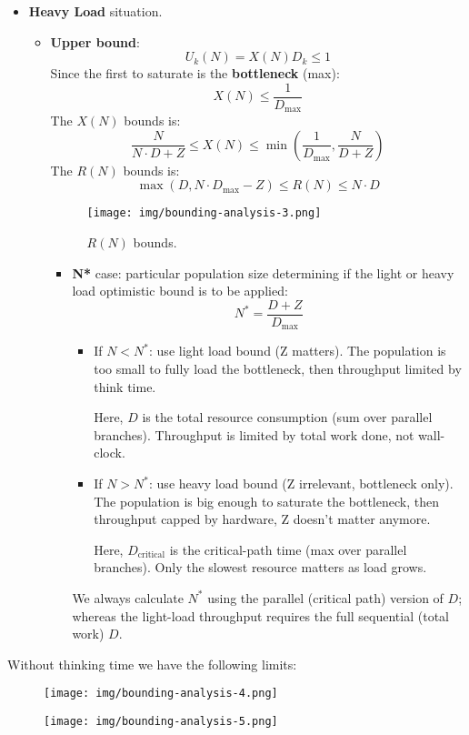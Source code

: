 \begin{itemize}
	\item \textbf{Heavy Load} situation.
	\begin{itemize}
		\item \textbf{Upper bound}:
		\begin{equation}
			U_{k}\left(N\right) = X\left(N\right) D_{k} \le 1
		\end{equation}
		Since the first to saturate is the \textbf{bottleneck} (max):
		\begin{equation}
			X\left(N\right) \le \dfrac{1}{D_{\max}}
		\end{equation}
		The $X\left(N\right)$ bounds is:
		\begin{equation}\label{eq: throughput limits - heavy load}
			\dfrac{N}{N \cdot D + Z} \le X\left(N\right) \le \min\left(\dfrac{1}{D_{\max}}, \dfrac{N}{D+Z}\right)
		\end{equation}
		The $R\left(N\right)$ bounds is:
		\begin{equation}\label{eq: response time - heavy load}
			\max\left(D, N \cdot D_{\max} - Z\right) \le R\left(N\right) \le N \cdot D
		\end{equation}
		\begin{figure}[!htp]
			\centering
			\texttt{[image: img/bounding-analysis-3.png]}
			\caption*{$R\left(N\right)$ bounds.}
		\end{figure}
		\begin{itemize}
			\item \textbf{N*} case: particular population size determining if the light or heavy load optimistic bound is to be applied:
			\begin{equation}\label{eq: N start - limit population size}
				N^{*} = \dfrac{D+Z}{D_{\max}}
			\end{equation}
			\begin{itemize}
				\item If $N < N^{*}$: use light load bound (Z matters). The population is too small to fully load the bottleneck, then throughput limited by think time.

				Here, $D$ is the total resource consumption (sum over parallel branches). Throughput is limited by total work done, not wall-clock.


				\item If $N > N^{*}$: use heavy load bound (Z irrelevant, bottleneck only). The population is big enough to saturate the bottleneck, then throughput capped by hardware, Z doesn't matter anymore.

				Here, $D_{\text{critical}}$ is the critical-path time (max over parallel branches). Only the slowest resource matters as load grows.
			\end{itemize}
			We always calculate $N^*$ using the parallel (critical path) version of $D$; whereas the light-load throughput requires the full sequential (total work) $D$.
		\end{itemize}
	\end{itemize}
\end{itemize}

\newpage

\noindent
Without thinking time we have the following limits:
\begin{figure}[!htp]
	\centering
	\texttt{[image: img/bounding-analysis-4.png]}
\end{figure}
\begin{figure}[!htp]
	\centering
	\texttt{[image: img/bounding-analysis-5.png]}
\end{figure}